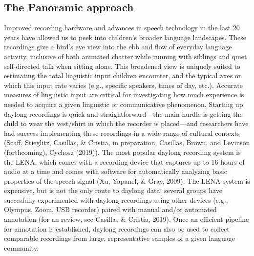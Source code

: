 \documentclass[,man,floatsintext]{apa6}
\begin{document}
\subsection{The Panoramic approach}\label{the-panoramic-approach}

Improved recording hardware and advances in speech technology in the
last 20 years have allowed us to peek into children's broader language
landscapes. These recordings give a bird's eye view into the ebb and
flow of everyday language activity, inclusive of both animated chatter
while running with siblings and quiet self-directed talk when sitting
alone. This broadened view is uniquely suited to estimating the total
linguistic input children encounter, and the typical axes on which this
input rate varies (e.g., specific speakers, times of day, etc.).
Accurate measures of linguistic input are critical for investigating how
much experience is needed to acquire a given linguistic or communicative
phenomenon. Starting up daylong recordings is quick and
straightforward---the main hurdle is getting the child to wear the
vest/shirt in which the recorder is placed---and researchers have had
success implementing these recordings in a wide range of cultural
contexts (Scaff, Stieglitz, Casillas, \& Cristia, in preparation,
Casillas, Brown, and Levinson (forthcoming), Cychosz (2019)). The most
popular daylong recording system is the LENA, which comes with a
recording device that captures up to 16 hours of audio at a time and
comes with software for automatically analyzing basic properties of the
speech signal (Xu, Yapanel, \& Gray, 2009). The LENA system is
expensive, but is not the only route to daylong data; several groups
have succesfully experimented with daylong recordings using other
devices (e.g., Olympus, Zoom, USB recorder) paired with manual and/or
automated annotation (for an review, see Casillas \& Cristia, 2019).
Once an efficient pipeline for annotation is established, daylong
recordings can also be used to collect comparable recordings from large,
representative samples of a given language community.
\end{document}
